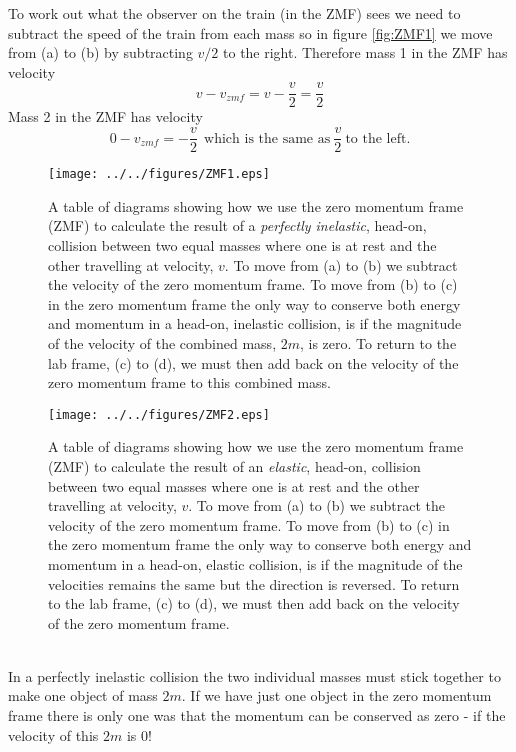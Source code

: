 \noindent To work out what the observer on the train (in the ZMF) sees we need to subtract the speed of the train from each mass so in figure \ref{fig:ZMF1} we move from (a) to (b) by subtracting $v/2$ to the right.  Therefore mass 1 in the ZMF has velocity
\begin{equation}
v-v_{zmf}=v-\frac{v}{2}=\frac{v}{2}
\end{equation}
Mass 2 in the ZMF has velocity
\begin{equation}
0-v_{zmf}=-\frac{v}{2}\ \  \mbox{which is the same as}\ \frac{v}{2}\ \mbox{to the left}.
\end{equation}
\addtocounter{figure}{-1}
\begin{wrapfigure}{r}{9cm}
\texttt{[image: ../../figures/ZMF1.eps]}
\caption{A table of diagrams showing how we use the zero momentum frame (ZMF) to calculate the result of a {\it perfectly inelastic}, head-on, collision between two equal masses where one is at rest and the other travelling at velocity, $v$.  To move from (a) to (b) we subtract the velocity of the zero momentum frame.  To move from (b) to (c) in the zero momentum frame the only way to conserve both energy and momentum in a head-on, inelastic collision, is if the magnitude of the velocity of the combined mass, $2m$, is zero.  To return to the lab frame, (c) to (d), we must then add back on the velocity of the zero momentum frame to this combined mass.}\vspace{0.5cm}\label{fig:ZMF1}
\texttt{[image: ../../figures/ZMF2.eps]}
\caption{A table of diagrams showing how we use the zero momentum frame (ZMF) to calculate the result of an {\it elastic}, head-on, collision between two equal masses where one is at rest and the other travelling at velocity, $v$.  To move from (a) to (b) we subtract the velocity of the zero momentum frame.  To move from (b) to (c) in the zero momentum frame the only way to conserve both energy and momentum in a head-on, elastic collision, is if the magnitude of the velocities remains the same but the direction is reversed.  To return to the lab frame, (c) to (d), we must then add back on the velocity of the zero momentum frame.} \label{fig:ZMF2} 
\end{wrapfigure}
\\
\noindent In a perfectly inelastic collision the two individual masses must stick together to make one object of mass $2m$.  If we have just one object in the zero momentum frame there is only one was that the momentum can be conserved as zero - if the velocity of this $2m$ is $ 0$! \\
